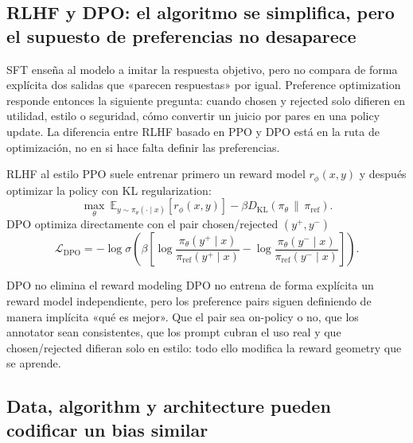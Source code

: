 \subsection{RLHF y DPO: el algoritmo se simplifica, pero el supuesto de preferencias no desaparece}

SFT enseña al modelo a imitar la respuesta objetivo, pero no compara de forma explícita dos salidas que «parecen respuestas» por igual. Preference optimization responde entonces la siguiente pregunta: cuando chosen y rejected solo difieren en utilidad, estilo o seguridad, cómo convertir un juicio por pares en una policy update. La diferencia entre RLHF basado en PPO y DPO está en la ruta de optimización, no en si hace falta definir las preferencias.

RLHF al estilo PPO suele entrenar primero un reward model $r_\phi(x,y)$ y después optimizar la policy con KL regularization:
\[
\max_\theta\ \mathbb{E}_{y\sim\pi_\theta(\cdot\mid x)}[r_\phi(x,y)]
-\beta D_{\mathrm{KL}}\!\left(\pi_\theta\,\|\,\pi_{\text{ref}}\right).
\]
DPO optimiza directamente con el pair chosen/rejected $(y^+,y^-)$
\[
\mathcal{L}_{\text{DPO}}
=-\log\sigma\!\left(\beta\left[
\log\frac{\pi_\theta(y^+\mid x)}{\pi_{\text{ref}}(y^+\mid x)}
-\log\frac{\pi_\theta(y^-\mid x)}{\pi_{\text{ref}}(y^-\mid x)}
\right]\right).
\]


\begin{warningbox}{DPO no elimina el reward modeling}
DPO no entrena de forma explícita un reward model independiente, pero los preference pairs siguen definiendo de manera implícita «qué es mejor». Que el pair sea on-policy o no, que los annotator sean consistentes, que los prompt cubran el uso real y que chosen/rejected difieran solo en estilo: todo ello modifica la reward geometry que se aprende.
\end{warningbox}


\subsection{Data, algorithm y architecture pueden codificar un bias similar}

